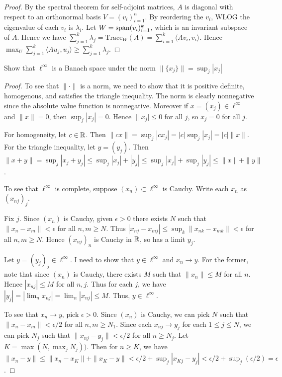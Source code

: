 \documentclass{article}
\begin{document}
\begin{proof}
By the spectral theorem for self-adjoint matrices, $A$ is diagonal with respect to an orthonormal basis $V = (v_i)_{i=1}^n$. By reordering the $v_i$, WLOG the eigenvalue of each $v_i$ is $\lambda_i$.  Let $W = \operatorname{span} (v_i)_{i=1}^k$, which is an invariant subspace of $A$.  Hence we have $\sum_{j=1}^k \lambda_j = \text{Trace}_W(A) = \sum_{i=1}^k \langle A v_i, v_i \rangle$. Hence $\max_U \sum_{j=1}^k \langle Au_j,u_j \rangle \ge \sum_{j=1}^k \lambda_j$.

\end{proof}


 Show that $\ell^\infty$ is a Banach space under the norm
  $\|\{x_j\}\|= \sup_j |x_j|$

\begin{proof}
To see that $\|\cdot\|$ is a norm, we need to show that it is positive definite, homogenous, and satisfies the triangle inequality. The norm is clearly nonnegative since the absolute value function is nonnegative.  Moreover if $x = (x_j) \in \ell^\infty$ and $\|x\| = 0$, then $\sup_j |x_j| = 0$. Hence $\|x_j| \le 0$ for all $j$, so $x_j = 0$ for all $j$.

For homogeneity, let $c \in \mathbb{R}$.  Then $\|c x\| = \sup_j |c x_j| = |c| \sup_j |x_j| = |c| \|x\|$.  For the triangle inequality, let $y = (y_j)$.  Then $\|x + y \| = \sup_j |x_j + y_j| \le \sup_j |x_j| + |y_j| \le \sup_j |x_j| + \sup_j |y_j| \le \|x\| + \|y\|$.

To see that $\ell^\infty$ is complete, suppose $(x_n) \subset \ell^\infty$ is Cauchy.  Write each $x_n$ as $(x_{nj})_j$.  

Fix $j$. Since $(x_n)$ is Cauchy, given $\epsilon > 0$ there exists $N$ such that $\|x_n - x_m \| < \epsilon$ for all $n,m \ge N$.  Thus $|x_{nj} - x_{mj}| \le \sup_k \|x_{nk} - x_{mk} \| < \epsilon$ for all $n,m \ge N$.  Hence $(x_{nj})_n$ is Cauchy in $\mathbb{R}$, so has a limit $y_j$. 

Let $y = (y_j)_j \in \ell^\infty$.  I need to show that $y \in \ell^\infty$ and $x_n \to y$.  For the former, note that since $(x_n)$ is Cauchy, there exists $M$ such that $\|x_n\| \le M$ for all $n$.  Hence $|x_{nj}| \le M$ for all $n, j$.  Thus for each $j$, we have $|y_j| = |\lim_n x_{nj}| = \lim_n |x_{nj}| \le M$. Thus, $y \in \ell^\infty$.  

To see that $x_n \to y$, pick $\epsilon > 0$.  Since $(x_n)$ is Cauchy, we can pick $N$ such that $\|x_n - x_m\| < \epsilon/2$ for all $n,m \ge N_1$. Since each $x_{nj} \to y_j$ for each $1 \le j \le N$, we can pick $N_j$ such that $\|x_{nj} - y_j \| < \epsilon/2$ for all $n \ge N_j$.  Let $K = \max(N, \max_j N_j))$.  Then for $n \ge K$, we have $\|x_n - y \| \le \|x_n - x_K\| + \|x_K - y\| < \epsilon/2 + \sup_j |x_{Kj} - y_j| < \epsilon/2 + \sup_j (\epsilon/2) = \epsilon$.
\end{proof}
\end{document}
